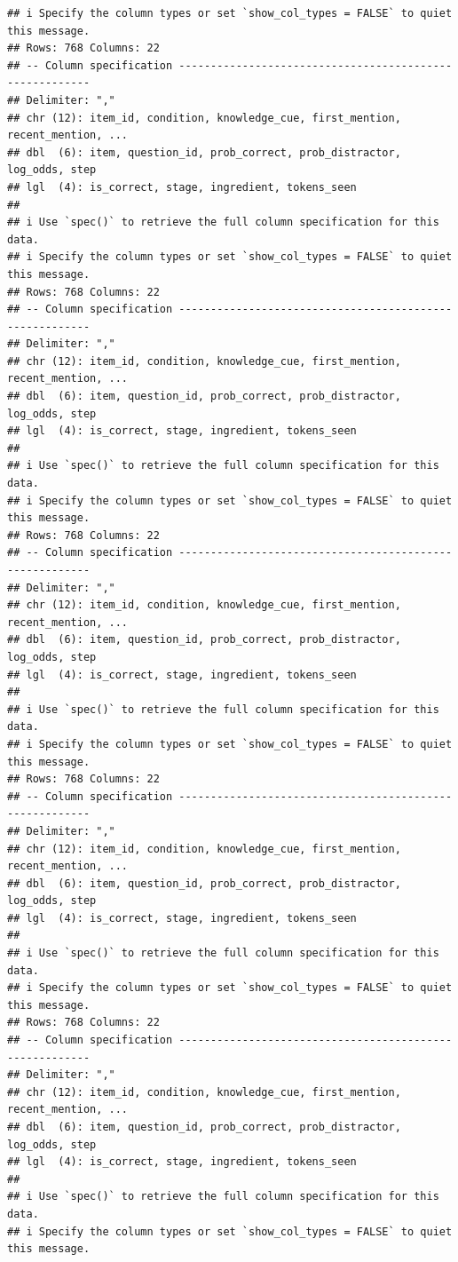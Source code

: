 \documentclass[
]{article}
\begin{document}
\begin{verbatim}
## i Specify the column types or set `show_col_types = FALSE` to quiet this message.
## Rows: 768 Columns: 22
## -- Column specification --------------------------------------------------------
## Delimiter: ","
## chr (12): item_id, condition, knowledge_cue, first_mention, recent_mention, ...
## dbl  (6): item, question_id, prob_correct, prob_distractor, log_odds, step
## lgl  (4): is_correct, stage, ingredient, tokens_seen
## 
## i Use `spec()` to retrieve the full column specification for this data.
## i Specify the column types or set `show_col_types = FALSE` to quiet this message.
## Rows: 768 Columns: 22
## -- Column specification --------------------------------------------------------
## Delimiter: ","
## chr (12): item_id, condition, knowledge_cue, first_mention, recent_mention, ...
## dbl  (6): item, question_id, prob_correct, prob_distractor, log_odds, step
## lgl  (4): is_correct, stage, ingredient, tokens_seen
## 
## i Use `spec()` to retrieve the full column specification for this data.
## i Specify the column types or set `show_col_types = FALSE` to quiet this message.
## Rows: 768 Columns: 22
## -- Column specification --------------------------------------------------------
## Delimiter: ","
## chr (12): item_id, condition, knowledge_cue, first_mention, recent_mention, ...
## dbl  (6): item, question_id, prob_correct, prob_distractor, log_odds, step
## lgl  (4): is_correct, stage, ingredient, tokens_seen
## 
## i Use `spec()` to retrieve the full column specification for this data.
## i Specify the column types or set `show_col_types = FALSE` to quiet this message.
## Rows: 768 Columns: 22
## -- Column specification --------------------------------------------------------
## Delimiter: ","
## chr (12): item_id, condition, knowledge_cue, first_mention, recent_mention, ...
## dbl  (6): item, question_id, prob_correct, prob_distractor, log_odds, step
## lgl  (4): is_correct, stage, ingredient, tokens_seen
## 
## i Use `spec()` to retrieve the full column specification for this data.
## i Specify the column types or set `show_col_types = FALSE` to quiet this message.
## Rows: 768 Columns: 22
## -- Column specification --------------------------------------------------------
## Delimiter: ","
## chr (12): item_id, condition, knowledge_cue, first_mention, recent_mention, ...
## dbl  (6): item, question_id, prob_correct, prob_distractor, log_odds, step
## lgl  (4): is_correct, stage, ingredient, tokens_seen
## 
## i Use `spec()` to retrieve the full column specification for this data.
## i Specify the column types or set `show_col_types = FALSE` to quiet this message.

\end{verbatim}
\end{document}
